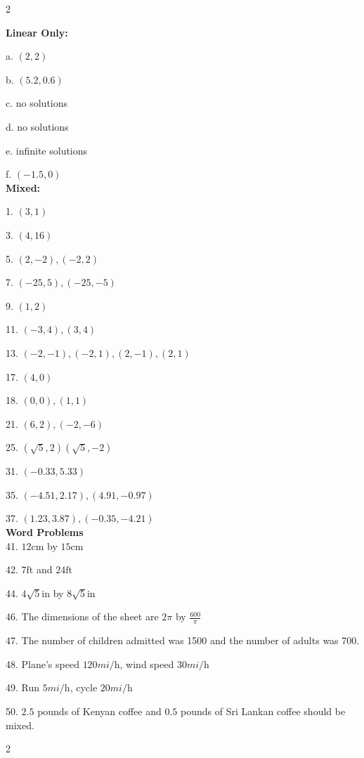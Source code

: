 \columnsep =30pt
\begin {multicols}{2}

\textbf{Linear Only:}

a. $\left (2 ,2\right )$ 

b. $\left (5.2 ,0.6\right )$

c. no solutions

d. no solutions

e. infinite solutions

f. $\left (-1.5 ,0\right )$\\
\break
\textbf{Mixed:}

1. $\left (3 ,1\right )$ 

3. $\left (4 ,16\right )$ 

5. $\left (2 , -2\right ) ,\left ( -2 ,2\right )$ 

7. $\left ( -25 ,5\right ) ,\left ( -25 , -5\right )$ 

9. $\left (1 ,2\right )$ 

11. $\left ( -3 ,4\right ) ,\left (3 ,4\right )$ 

13. $\left ( -2 , -1\right ) ,\left ( -2 ,1\right ) ,\left (2 , -1\right ) ,\left (2 ,1\right )$ 

17. $\left (4 ,0\right )$ 

18. $\left (0 ,0\right ) ,\left (1 ,1\right )$ 

21. $\left (6 ,2\right ) ,\left ( -2 , -6\right )$ 

25. $\left (\sqrt{5} ,2\right )\left (\sqrt{5} , -2\right )$ 

31. $\left ( -0.33 ,5.33\right )$ 

35. $\left ( -4.51 ,2.17\right ) ,\left (4.91 , -0.97\right )$ 

37. $\left (1.23 ,3.87\right ) ,\left ( -0.35 , -4.21\right )$ \\
\break
\textbf{Word Problems}\\

41. $12 \mbox{cm}$ by $15 \mbox{cm}$ 

42. $7 \mbox{ft}$ and $24 \mbox{ft}$ 

44. $4 \sqrt{5} \mbox{in}$ by $8 \sqrt{5} \mbox{in}$ 

46. The dimensions of the sheet are $2 \pi $ by $\frac{600}{\pi }$  

47. The number of children admitted was 1500 and the number
of adults was 700. 

48. Plane's speed $120 mi/\mbox{h}$, wind speed $30 mi/\mbox{h}$ 

49. Run $5 mi/\mbox{h}$, cycle $20 mi/\mbox{h}$ 

50. $2.5$ pounds of Kenyan coffee and $0.5$ pounds of Sri Lankan coffee should be mixed. 



\end {multicols}

\columnsep =30pt
\begin {multicols}{2}

\end {multicols}

